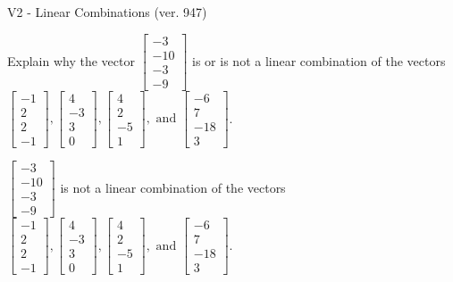 \begin{exercise}
  \begin{exerciseTitle}V2 - Linear Combinations (ver. 947)\end{exerciseTitle}
  \begin{exerciseStatement}
    Explain why the vector \(\left[\begin{array}{c}
-3 \\
-10 \\
-3 \\
-9
\end{array}\right]\)  is or is not a linear 
	combination of the vectors \(\left[\begin{array}{c}
-1 \\
2 \\
2 \\
-1
\end{array}\right] , \left[\begin{array}{c}
4 \\
-3 \\
3 \\
0
\end{array}\right] , \left[\begin{array}{c}
4 \\
2 \\
-5 \\
1
\end{array}\right] , \text{ and } \left[\begin{array}{c}
-6 \\
7 \\
-18 \\
3
\end{array}\right]\).
	


  \end{exerciseStatement}
  \begin{exerciseAnswer}
   \(\left[\begin{array}{c}
-3 \\
-10 \\
-3 \\
-9
\end{array}\right]\) 
  	 is not  
	a linear combination of the vectors \(\left[\begin{array}{c}
-1 \\
2 \\
2 \\
-1
\end{array}\right] , \left[\begin{array}{c}
4 \\
-3 \\
3 \\
0
\end{array}\right] , \left[\begin{array}{c}
4 \\
2 \\
-5 \\
1
\end{array}\right] , \text{ and } \left[\begin{array}{c}
-6 \\
7 \\
-18 \\
3
\end{array}\right]\).


\end{exerciseAnswer}
\end{exercise}
